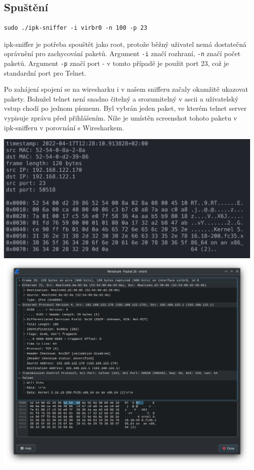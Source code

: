 \documentclass[12pt,a4paper]{article}
\begin{document}
\subsection{Spuštění}
\begin{verbatim}
sudo ./ipk-sniffer -i virbr0 -n 100 -p 23
\end{verbatim}

ipk-sniffer je potřeba spouštět jako root, protože běžný uživatel nemá dostatečná oprávnění pro zachycování paketů.
Argument \texttt{-i} značí rozhraní, \texttt{-n} značí počet paketů.
Argument \texttt{-p} značí port - v tomto případě je použit port 23, což je standardní port pro Telnet.

Po zahájení spojení se na wiresharku i v našem snifferu začaly okamžitě ukazovat pakety.
Bohužel telnet není snadno čitelný a srozumitelný v ascii a uživatelský vstup chodí po jednom písmenu.
Byl vybrán jeden paket, ve kterém telnet server vypisuje zprávu před přihlášením.
Níže je umístěn screenshot tohoto paketu v ipk-snifferu v porovnání s Wiresharkem.
\newpage

\begin{center}
\includegraphics[width=0.7\linewidth]{img/welcome.png}  \\
\includegraphics[width=1\linewidth]{img/welcome_wireshark.png}
\end{center}
\end{document}
